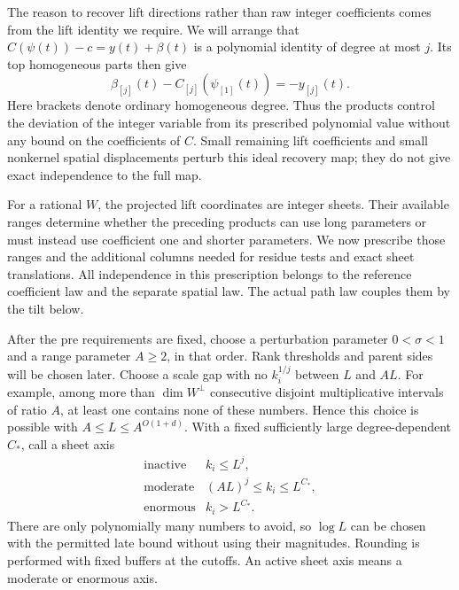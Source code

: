 The reason to recover lift directions rather than raw integer
coefficients comes from the lift identity we require. We will
arrange that $C(\psi(t))-c=y(t)+\beta(t)$ is a polynomial identity
of degree at most $j$. Its top homogeneous parts then give
\[
 \beta_{[j]}(t)-C_{[j]}(\psi_{[1]}(t))=-y_{[j]}(t).
\]
Here brackets denote ordinary homogeneous degree. Thus the products control the deviation of the integer variable
from its prescribed polynomial value without any bound on the
coefficients of $C$. Small remaining lift coefficients and small
nonkernel spatial displacements perturb this ideal recovery map;
they do not give exact independence to the full map.

For a rational $W$, the projected lift coordinates are integer
sheets. Their available ranges determine whether the preceding
products can use long parameters or must instead use coefficient
one and shorter parameters. We now prescribe those ranges and
the additional columns needed for residue tests and exact sheet
translations. All independence in this prescription belongs to
the reference coefficient law and the separate spatial law.
The actual path law couples them by the tilt below.

After the pre requirements are fixed, choose a perturbation
parameter $0<\sigma<1$ and a range parameter $A\ge2$, in that
order. Rank thresholds and parent sides will be chosen later.
Choose a scale gap with no $k_i^{1/j}$ between $L$ and $AL$.
For example, among more than $\dim W^\perp$ consecutive disjoint
multiplicative intervals of ratio $A$, at least one contains none
of these numbers. Hence this choice is possible with
$A\le L\le A^{O(1+d)}$.  With a fixed sufficiently large
degree-dependent $C_*$, call a sheet axis
\[
 \begin{array}{ll}
 \text{inactive}& k_i\le L^j,\\
 \text{moderate}& (AL)^j\le k_i\le L^{C_*},\\
 \text{enormous}& k_i>L^{C_*}.
 \end{array}
\]
There are only polynomially many numbers to avoid, so $\log L$ can
be chosen with the permitted late bound without using their magnitudes.
Rounding is performed with fixed buffers at the cutoffs.
An active sheet axis means a moderate or enormous axis.

